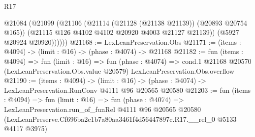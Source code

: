 \begin{lexlean}{R17}
\begin{coremodule}
          @21084
            (@21099
              (@21106
                (@21114 (@21128 (@21138 @21139)) (@20893 @20754 @165))
                (@21115 @126 @4102 @4102 @20920 @4003 @21127 @21139))
              (@5927 @20924 @20920))))))
@21168 := LexLeanPreservation.Obs
@21171 := (items : @4094) -> (limit : @16) -> (phase : @4074) -> @21168
@21182 := fun (items : @4094) =>
  fun (limit : @16) =>
  fun (phase : @4074) =>
  cond.{1} @21168 @20570 (LexLeanPreservation.Obs.value @20579) LexLeanPreservation.Obs.overflow
@21190 := (items : @4094) ->
  (limit : @16) -> (phase : @4074) -> LexLeanPreservation.RunConv @4111 @96 @20565 @20580
@21203 := fun (items : @4094) =>
  fun (limit : @16) =>
  fun (phase : @4074) =>
  LexLeanPreservation.run_of_funRel
    @4111
    @96
    @20565
    @20580
    (LexLeanPreserve.Cf696ba2c1b7a80aa3461f4d56447897c.R17.__rel_0 @5133 @4117 @3975)
\end{coremodule}
\end{lexlean}
